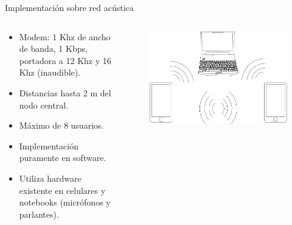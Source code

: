 \documentclass[aspectratio=169]{beamer}
\begin{document}
\begin{frame}{Implementación sobre red \color{red}acústica}

\begin{columns}
  \begin{column}{0.50\textwidth}

\begin{itemize}
 \item Modem: 1 Khz de ancho de banda, 1 Kbps, portadora a 12 Khz y 16 Khz (inaudible).
 \item Distancias hasta 2 m del nodo central.
 \item Máximo de 8 usuarios.
 \item Implementación puramente en software.
 \item Utiliza hardware existente en celulares y notebooks (micrófonos y parlantes).
 \end{itemize}

  \end{column}
  \begin{column}{0.50\textwidth}

 
\begin{figure}[t]
  \centering
  \includegraphics[width=0.85 \textwidth]{../graphs/compucelus.pdf}
\end{figure}

  \end{column}
\end{columns}

\end{frame}


\end{document}

